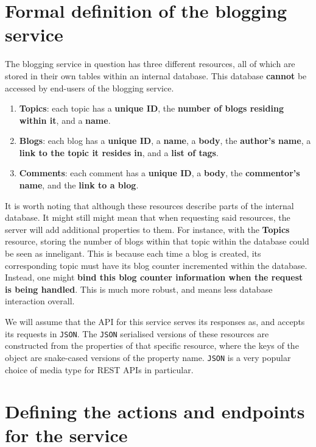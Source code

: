 \documentclass[]{full}
\theoremstyle{definition}
\begin{document}
\section{Formal definition of the blogging service}

The blogging service in question has three different resources, all of which are stored in their own tables within an internal database. This database \textbf{cannot} be accessed by end-users of the blogging service.

\begin{enumerate}
    \item \textbf{Topics}: each topic has a \textbf{unique ID}, the \textbf{number of blogs residing within it}, and a \textbf{name}.
    \item \textbf{Blogs}: each blog has a \textbf{unique ID}, a \textbf{name}, a \textbf{body}, the \textbf{author's name}, a \textbf{link to the topic it resides in}, and a \textbf{list of tags}.
    \item \textbf{Comments}: each comment has a \textbf{unique ID}, a \textbf{body}, the \textbf{commentor's name}, and the \textbf{link to a blog}.
\end{enumerate}

It is worth noting that although these resources describe parts of the internal database. It might still might mean that when requesting said resources, the server will add additional properties to them. For instance, with the \textbf{Topics} resource, storing the number of blogs within that topic within the database could be seen as inneligant. This is because each time a blog is created, its corresponding topic must have its blog counter incremented within the database. Instead, one might \textbf{bind this blog counter information when the request is being handled}. This is much more robust, and means less database interaction overall.

We will assume that the API for this service serves its responses as, and accepts its requests in \verb|JSON|. The \verb|JSON| serialised versions of these resources are constructed from the properties of that specific resource, where the keys of the object are snake-cased versions of the property name. \verb|JSON| is a very popular choice of media type for REST APIs in particular.

\section{Defining the actions and endpoints for the service}
\end{document}
